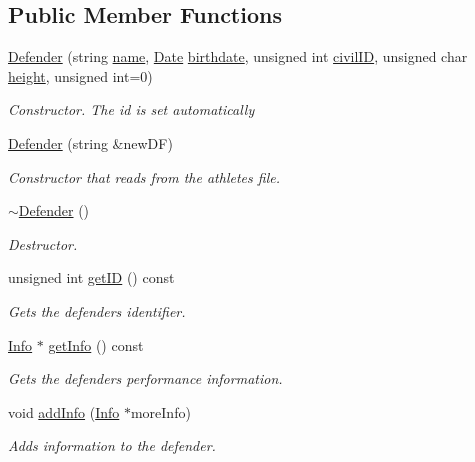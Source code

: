 \subsection*{Public Member Functions}
\begin{DoxyCompactItemize}
\item 
\hyperlink{class_defender_aa09b1f02e3314aef1463528b3a0c70e2}{Defender} (string \hyperlink{class_worker_a66cf57341253a31e418cf8abad59ffb1}{name}, \hyperlink{class_date}{Date} \hyperlink{class_worker_a3c1845f40a084b471750a787a87614dd}{birthdate}, unsigned int \hyperlink{class_worker_adfafba55f967994f4595bd914bbba127}{civil\+ID}, unsigned char \hyperlink{class_athlete_a80a64bb1d5c943aaa7ca152d596d9914}{height}, unsigned int=0)
\begin{DoxyCompactList}\small\item\em Constructor. The id is set automatically \end{DoxyCompactList}\item 
\hyperlink{class_defender_a2ad862369c0babb9fc303d43bfa3321b}{Defender} (string \&new\+DF)
\begin{DoxyCompactList}\small\item\em Constructor that reads from the athlete\textquotesingle{}s file. \end{DoxyCompactList}\item 
\hyperlink{class_defender_ac0872f9e6cae6078b87cbcf9fa32f3ba}{$\sim$\+Defender} ()
\begin{DoxyCompactList}\small\item\em Destructor. \end{DoxyCompactList}\item 
unsigned int \hyperlink{class_defender_ad2aadb1cb382bf08522bd858ecc69667}{get\+ID} () const
\begin{DoxyCompactList}\small\item\em Gets the defender\textquotesingle{}s identifier. \end{DoxyCompactList}\item 
\hyperlink{class_info}{Info} $\ast$ \hyperlink{class_defender_a54de21eac6353f8847ac109b8a08fcab}{get\+Info} () const
\begin{DoxyCompactList}\small\item\em Gets the defender\textquotesingle{}s performance information. \end{DoxyCompactList}\item 
void \hyperlink{class_defender_abcd887808491719d6e40d92d68862b4e}{add\+Info} (\hyperlink{class_info}{Info} $\ast$more\+Info)
\begin{DoxyCompactList}\small\item\em Adds information to the defender. \end{DoxyCompactList}\end{DoxyCompactItemize}
